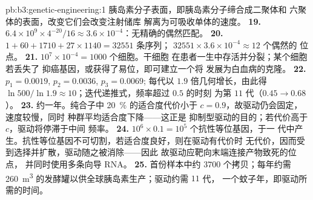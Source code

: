 \begin{solution}{pb:b3:genetic-engineering:1}
胰岛素分子表面，即胰岛素分子缔合成二聚体和
六聚体的表面，改变它们会改变注射储库
解离为可吸收单体的速度。
\textbf{19.} $6.4\times 10^{9}\times 4^{-20}/16 \approx 3.6\times
10^{-4}$：无精确的偶然匹配。
\textbf{20.} $1 + 60 + 1710 + 27\times 1140 = \num{32551}$ 条序列；
$\num{32551}\times 3.6\times 10^{-4} \approx 12$ 个偶然的
位点。
\textbf{21.} $10^{7}\times 10^{-4} = 1000$ 个细胞。干细胞
在患者一生中存活并分裂；某个细胞若丢失了
抑癌基因，或获得了易位，即可建立一个将
发展为白血病的克隆。
\textbf{22.} $p_{1} = 0.0019$, $p_{2} = 0.0036$, $p_{3} = 0.0069$;
每代以 $1.9$ 倍几何增长，由此得 $\ln 500/\ln 1.9
\approx 10$；迭代递推式，频率超过 $0.5$ 的时刻
为第 $11$ 代（$0.45 \to 0.68$）。
\textbf{23.} 约一年。纯合子中 \qty{20}{\%} 的适合度代价小于
$c = 0.9$，故驱动仍会固定，速度较慢，同时
种群平均适合度下降——这正是
抑制型驱动的目的；若代价高于 $c$，驱动将停滞于中间
频率。
\textbf{24.} $10^{6}\times 0.1 = 10^{5}$ 个抗性等位基因，于一
代中产生。抗性等位基因不可切割，若适合度良好，则在驱动有代价时
无代价，因而受到选择并扩散，驱动随之被消除——因此
故驱动应靶向末端连接产物致死的位点，
并同时使用多条向导 RNA。
\textbf{25.} 首份样本中约 $3700$ 个拷贝；每年约需 \qty{260}{m^3}
的发酵罐以供全球胰岛素生产；驱动约需 $11$ 代，
一个蚊子年，即驱动所需的时间。
\end{solution}
